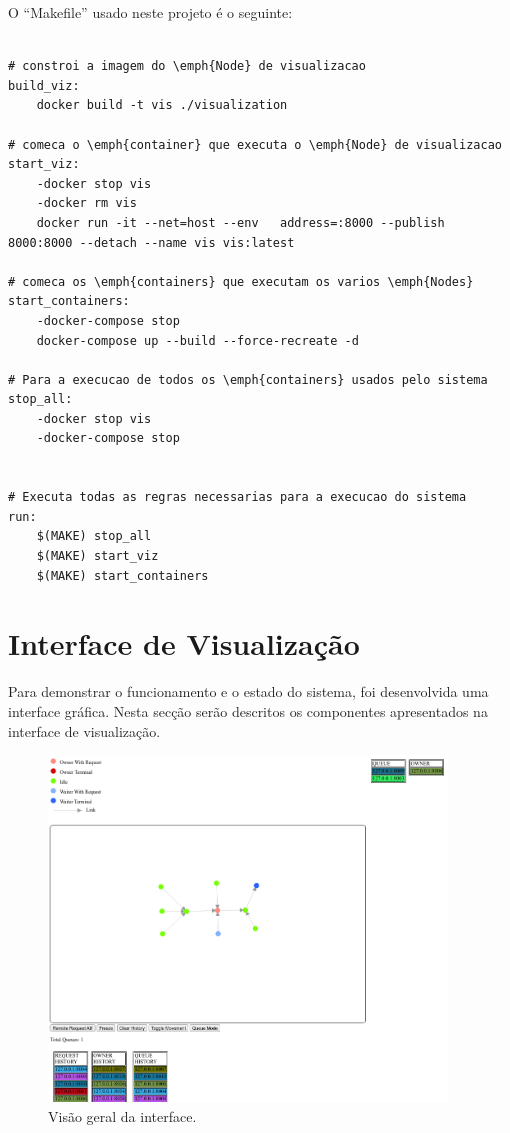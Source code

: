 O ``Makefile'' usado neste projeto é o seguinte:

\begin{lstlisting}[caption={Ficheiro ``Makefile''}]

# constroi a imagem do \emph{Node} de visualizacao
build_viz:
	docker build -t vis ./visualization

# comeca o \emph{container} que executa o \emph{Node} de visualizacao
start_viz:
	-docker stop vis
	-docker rm vis
	docker run -it --net=host --env   address=:8000 --publish 8000:8000 --detach --name vis vis:latest

# comeca os \emph{containers} que executam os varios \emph{Nodes}
start_containers:
	-docker-compose stop
	docker-compose up --build --force-recreate -d

# Para a execucao de todos os \emph{containers} usados pelo sistema
stop_all:
	-docker stop vis
	-docker-compose stop


# Executa todas as regras necessarias para a execucao do sistema
run:
	$(MAKE) stop_all
	$(MAKE) start_viz
	$(MAKE) start_containers
\end{lstlisting}


\section{Interface de Visualização}
Para demonstrar o funcionamento e o estado do sistema, foi desenvolvida uma interface gráfica. Nesta secção serão descritos os componentes apresentados na interface de visualização.

\begin{figure}[!htb]
\centering
\includegraphics[width=300pt]{relatorio_overview.png}
\caption{Visão geral da interface.}
\end{figure}

